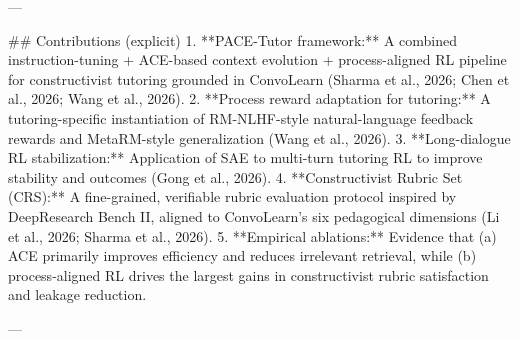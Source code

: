 ---

## Contributions (explicit)  
1. **PACE-Tutor framework:** A combined instruction-tuning + ACE-based context evolution + process-aligned RL pipeline for constructivist tutoring grounded in ConvoLearn (Sharma et al., 2026; Chen et al., 2026; Wang et al., 2026).  
2. **Process reward adaptation for tutoring:** A tutoring-specific instantiation of RM-NLHF-style natural-language feedback rewards and MetaRM-style generalization (Wang et al., 2026).  
3. **Long-dialogue RL stabilization:** Application of SAE to multi-turn tutoring RL to improve stability and outcomes (Gong et al., 2026).  
4. **Constructivist Rubric Set (CRS):** A fine-grained, verifiable rubric evaluation protocol inspired by DeepResearch Bench II, aligned to ConvoLearn’s six pedagogical dimensions (Li et al., 2026; Sharma et al., 2026).  
5. **Empirical ablations:** Evidence that (a) ACE primarily improves efficiency and reduces irrelevant retrieval, while (b) process-aligned RL drives the largest gains in constructivist rubric satisfaction and leakage reduction.

---